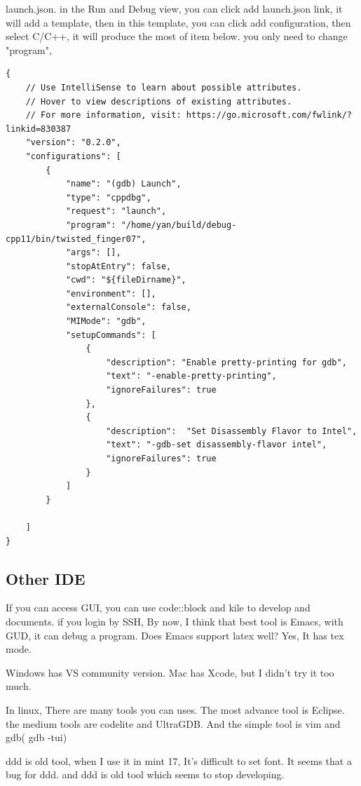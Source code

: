 \documentclass[paper=8.5in:11in, twoside, 12pt, pagesize=pdftex]{book}
\begin{document}
launch.json.  in the Run and Debug view, you can click add launch.json link, it will add a template, then in this template, you can click add configuration, then select C/C++, it will produce the most of item below. you only need to change "program", 

\begin{lstlisting}[mathescape=false]
{
    // Use IntelliSense to learn about possible attributes.
    // Hover to view descriptions of existing attributes.
    // For more information, visit: https://go.microsoft.com/fwlink/?linkid=830387
    "version": "0.2.0",
    "configurations": [
        {
            "name": "(gdb) Launch",
            "type": "cppdbg",
            "request": "launch",
            "program": "/home/yan/build/debug-cpp11/bin/twisted_finger07",
            "args": [],
            "stopAtEntry": false,
            "cwd": "${fileDirname}",
            "environment": [],
            "externalConsole": false,
            "MIMode": "gdb",
            "setupCommands": [
                {
                    "description": "Enable pretty-printing for gdb",
                    "text": "-enable-pretty-printing",
                    "ignoreFailures": true
                },
                {
                    "description":  "Set Disassembly Flavor to Intel",
                    "text": "-gdb-set disassembly-flavor intel",
                    "ignoreFailures": true
                }
            ]
        }

    ]
}
\end{lstlisting}

\ifdefined\autotools

\subsection{Other IDE}
If you can access GUI, you can use code::block and kile to develop and documents. if
you login by SSH, By now, I think that best tool is Emacs, with GUD, it can debug a
program. Does Emacs support latex well? Yes, It has tex mode. 

Windows has VS community version.  Mac has Xcode, but I didn't try it too much. 

In linux, There are many tools you can uses. The most advance tool is Eclipse. the medium tools are codelite and UltraGDB. And the simple tool is vim and gdb( gdb -tui) 

ddd is old tool, when I use it in mint 17, It's difficult to set font.  It seems that a bug for ddd. and ddd is old tool which seems to stop developing.  
\end{document}
